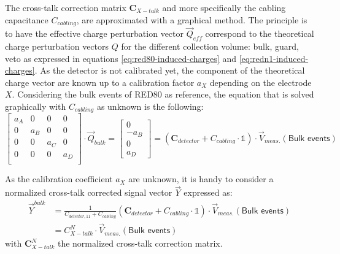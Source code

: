 The cross-talk correction matrix $\bm{C}_{X-talk}$ and more specifically the cabling capacitance $C_{cabling}$, are approximated with a graphical method. The principle is to have the effective charge perturbation vector $\vec{Q}_{eff}$ correspond to the theoretical charge perturbation vectors $Q$ for the different collection volume: bulk, guard, veto as expressed in equations \ref{eq:red80-induced-charges} and \ref{eq:redn1-induced-charges}. As the detector is not calibrated yet, the component of the theoretical charge vector are known up to a calibration factor $a_X$ depending on the electrode $X$. Considering the bulk events of RED80 as reference, the equation that is solved graphically with $C_{cabling}$ as unknown is the following:
\begin{equation}
\label{eq:crosstalk-correction}
\begin{bmatrix}
a_A & 0 & 0 & 0 \\
0 & a_B & 0 & 0 \\
0 & 0 & a_C & 0 \\
0 & 0 & 0 & a_D \\
\end{bmatrix}
\cdot
\vec{Q}_{bulk}
=
\begin{bmatrix}
0 \\ -a_B \\ 0 \\ a_D
\end{bmatrix} 
=
\left( \bm{C}_{detector} + C_{cabling} \cdot \mathbb{1} \right) \cdot \vec{V}_{meas.}(\textsf{Bulk events})
\end{equation}

As the calibration coefficient $a_X$ are unknown, it is handy to consider a normalized cross-talk corrected signal vector $\vec{Y}$ expressed as:
\begin{equation}
\begin{split}
\vec{Y}^{bulk}
&=
\frac{1}{C_{detector, 11} + C_{cabling}}
\left( \bm{C}_{detector} + C_{cabling} \cdot \mathbb{1} \right) \cdot \vec{V}_{meas.}(\textsf{Bulk events})
\\
&= C_{X-talk}^N \cdot \vec{V}_{meas.}(\textsf{Bulk events})
\end{split}
\end{equation}
with $\bm{C}_{X-talk}^N$ the normalized cross-talk correction matrix.

